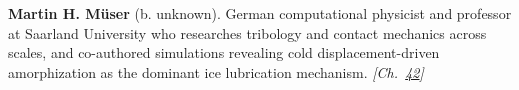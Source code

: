 \textbf{Martin H. M\"{u}ser} (b. unknown). German computational physicist and professor at Saarland University who researches tribology and contact mechanics across scales, and co-authored simulations revealing cold displacement-driven amorphization as the dominant ice lubrication mechanism. \emph{[Ch.~\hyperref[ch:iceslipperiness]{42}]}

